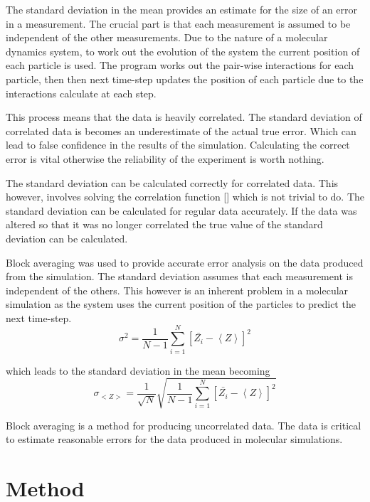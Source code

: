 \documentclass[a4paper, oneside 12pt]{article}
\begin{document}
\begin{addmargin}[-3em]{-3em}
The standard deviation in the mean provides an estimate for the size of an error in a measurement. The crucial part is that each measurement is assumed to be independent of the other measurements. Due to the nature of a molecular dynamics system, to work out the evolution of the system the current position of each particle is used. The program works out the pair-wise interactions for each particle, then then next time-step updates the position of each particle due to the interactions calculate at each step. 

This process means that the data is heavily correlated. The standard deviation of correlated data is becomes an underestimate of the actual true error. Which can lead to false confidence in the results of the simulation. Calculating the correct error is vital otherwise the reliability of the experiment is worth nothing. 

The standard deviation can be calculated correctly for correlated data. This however, involves solving the correlation function [] which is not trivial to do. The standard deviation can be calculated for regular data accurately. If the data was altered so that it was no longer correlated the true value of the standard deviation can be calculated.  

Block averaging was used to provide accurate error analysis on the data produced from the simulation. The standard deviation assumes that each measurement is independent of the others. This however is an inherent problem in a molecular simulation as the system uses the current position of the particles to predict the next time-step.   
\begin{equation}
\sigma ^2 = \frac{1}{N-1} \sum_{i=1}^{N} \left[\bar{Z_i} - \left<Z \right>\right]^2
\end{equation}

which leads to the standard deviation in the mean becoming
\begin{equation}
\sigma _{<Z>}= \frac{1}{\sqrt{N}}\sqrt{\frac{1}{N-1} \sum_{i=1}^{N} \left[\bar{Z_i} - \left<Z \right>\right]^2}
\end{equation}

Block averaging is a method for producing uncorrelated data. The data is critical to estimate reasonable errors for the data produced in molecular simulations.

\section{Method}


\end{addmargin}
\end{document}
